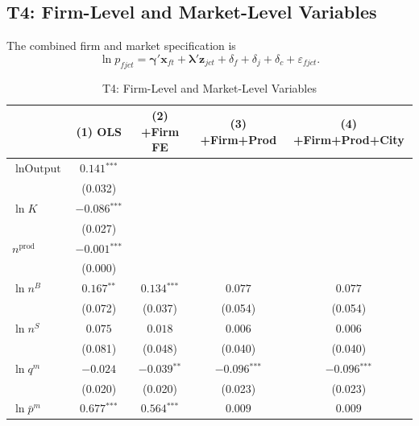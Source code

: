 \documentclass[12pt]{article}
\newcommand{\sym}[1]{\ensuremath{^{\text{#1}}}}
\newcommand{\se}[1]{{\small(#1)}}
\newcommand{\abs}{\textemdash}
\begin{document}
\subsection{T4: Firm-Level and Market-Level Variables}
\label{sec:t4}

The combined firm and market specification is
\begin{equation}
  \ln p_{fjct}
  = \boldsymbol{\gamma}' \mathbf{x}_{ft}
  + \boldsymbol{\lambda}' \mathbf{z}_{jct}
  + \delta_f + \delta_j + \delta_c
  + \varepsilon_{fjct}.
  \label{eq:t4}
\end{equation}

\begin{landscape}
\begin{table}[H]
  \centering
  \caption{T4: Firm-Level and Market-Level Variables}
  \label{tab:t4}
  \begin{threeparttable}
    \begin{tabular}{lcccc}
      \toprule
      & (1) OLS & (2) +Firm FE & (3) +Firm+Prod & (4) +Firm+Prod+City \\
      \midrule
      \(\ln \text{Output}\) & \(0.141\sym{***}\) & \abs & \abs & \abs \\
                             & \se{0.032} & & & \\[4pt]
      \(\ln K\) & \(-0.086\sym{***}\) & \abs & \abs & \abs \\
                & \se{0.027} & & & \\[4pt]
      \(n^{\text{prod}}\) & \(-0.001\sym{***}\) & \abs & \abs & \abs \\
                          & \se{0.000} & & & \\[4pt]
      \(\ln n^{B}\) & \(0.167\sym{**}\) & \(0.134\sym{***}\) & \(0.077\) & \(0.077\) \\
                    & \se{0.072} & \se{0.037} & \se{0.054} & \se{0.054} \\[4pt]
      \(\ln n^{S}\) & \(0.075\) & \(0.018\) & \(0.006\) & \(0.006\) \\
                    & \se{0.081} & \se{0.048} & \se{0.040} & \se{0.040} \\[4pt]
      \(\ln q^{m}\) & \(-0.024\) & \(-0.039\sym{**}\) & \(-0.096\sym{***}\) & \(-0.096\sym{***}\) \\
                    & \se{0.020} & \se{0.020} & \se{0.023} & \se{0.023} \\[4pt]
      \(\ln \bar{p}^{m}\) & \(0.677\sym{***}\) & \(0.564\sym{***}\) & \(0.009\) & \(0.009\) \\

\end{tabular}
\end{threeparttable}
\end{table}
\end{landscape}
\end{document}

